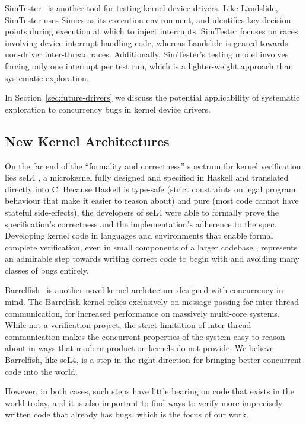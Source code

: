 SimTester~\cite{simtester} is another tool for testing kernel device drivers. Like Landslide, SimTester uses Simics as its execution environment, and identifies key decision points during execution at which to inject interrupts. SimTester focuses on races involving device interrupt handling code, whereas Landslide is geared towards non-driver inter-thread races. Additionally, SimTester's testing model involves forcing only one interrupt per test run, which is a lighter-weight approach than systematic exploration.

In Section~\ref{sec:future-drivers} we discuss the potential applicability of systematic exploration to concurrency bugs in kernel device drivers.

\subsection{New Kernel Architectures}

On the far end of the ``formality and correctness'' spectrum for kernel verification lies seL4 \cite{sel4}, a microkernel fully designed and specified in Haskell and translated directly into C. Because Haskell is type-safe (strict constraints on legal program behaviour that make it easier to reason about) and pure (most code cannot have stateful side-effects), the developers of seL4 were able to formally prove the specification's correctness and the implementation's adherence to the spec.
Developing kernel code in languages and environments that enable formal complete verification, even in small components of a larger codebase , represents an admirable step towards writing correct code to begin with and avoiding many classes of bugs entirely.

Barrelfish~\cite{barrelfish} is another novel kernel architecture designed with concurrency in mind. The Barrelfish kernel relies exclusively on message-passing for inter-thread communication, for increased performance on massively multi-core systems. While not a verification project, the strict limitation of inter-thread communication makes the concurrent properties of the system easy to reason about in ways that modern production kernels do not provide.
We believe Barrelfish, like seL4, is a step in the right direction for bringing better concurrent code into the world.

However, in both cases, such steps have little bearing on code that exists in the world today, and it is also important to find ways to verify more imprecisely-written code that already has bugs, which is the focus of our work.


